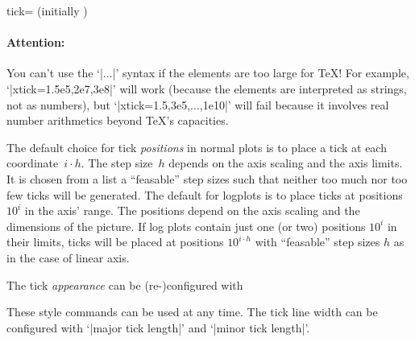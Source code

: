 \begin{pgfplotsxykey}{\x tick= (initially \marg{})}
\begin{codeexample}[]
\end{codeexample}

\paragraph{Attention:} You can't use the `|...|' syntax if the elements are too large for \TeX! For example, `|xtick=1.5e5,2e7,3e8|' will work (because the elements are interpreted as strings, not as numbers), but `|xtick=1.5,3e5,...,1e10|' will fail because it involves real number arithmetics beyond \TeX's capacities.
\vspace*{0.3cm}

\noindent
The default choice for tick \emph{positions} in normal plots is to place a tick at each coordinate~$i\cdot h$. The step size~$h$ depends on the axis scaling and the axis limits. It is chosen from a list a ``feasable'' step sizes such that neither too much nor too few ticks will be generated. The default for logplots is to place ticks at positions $10^i$ in the axis' range. The positions depend on the axis scaling and the dimensions of the picture. If log plots contain just one (or two) positions $10^i$ in their limits, ticks will be placed at positions $10^{i\cdot h}$ with ``feasable'' step sizes $h$ as in the case of linear axis.

\noindent
The tick \emph{appearance} can be (re-)configured with
\begin{codeexample}
\end{codeexample}

These style commands can be used at any time. The tick line width can be configured with `|major tick length|' and `|minor tick length|'.

\begin{codeexample}[]
\end{codeexample}


\end{pgfplotsxykey}
